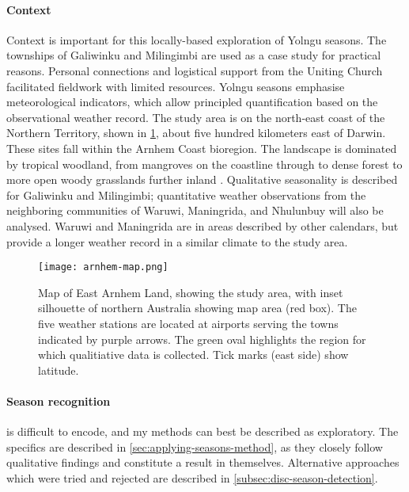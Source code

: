 \paragraph{Context}
Context is important for this locally-based exploration of Yolngu seasons.
The townships of Galiwinku and Milingimbi are used as a case study for
practical reasons.  Personal connections and
logistical support from the Uniting Church facilitated fieldwork with limited
resources.  Yolngu seasons emphasise meteorological indicators, which allow
principled quantification based on the observational weather record.
%
The study area is on the north-east coast of the Northern Territory, shown
in  \cref{fig:arnhem-map}, about five hundred kilometers east of Darwin.
These sites fall within the Arnhem Coast bioregion.  The landscape is
dominated by tropical woodland, from mangroves on the coastline through
to dense forest to more open woody grasslands further inland \citep{ens2014}.
Qualitative seasonality is described for Galiwinku and Milingimbi;
quantitative weather observations from the neighboring communities of Waruwi, Maningrida, and Nhulunbuy
will also be analysed.  Waruwi and Maningrida are in areas described by
other calendars, but provide a longer weather record in a similar climate
to the study area.
%


\begin{figure}[t]
    \centering
    \texttt{[image: arnhem-map.png]}
    \caption[Map of East Arnhem Land, showing the study area]{
        Map of East Arnhem Land, showing the study area, with inset silhouette
        of northern Australia showing map area (red box).  The five weather
        stations are located at airports serving the towns indicated by purple
        arrows.  The green oval highlights the region for which qualitiative
        data is collected.  Tick marks (east side) show latitude.}
    \label{fig:arnhem-map}
\end{figure}



\paragraph{Season recognition} is difficult to encode, and my methods can
best be described as exploratory.  The specifics are described in
\cref{sec:applying-seasons-method}, as they closely follow qualitative
findings and constitute a result in themselves.  Alternative approaches
which were tried and rejected are described in \cref{subsec:disc-season-detection}.

